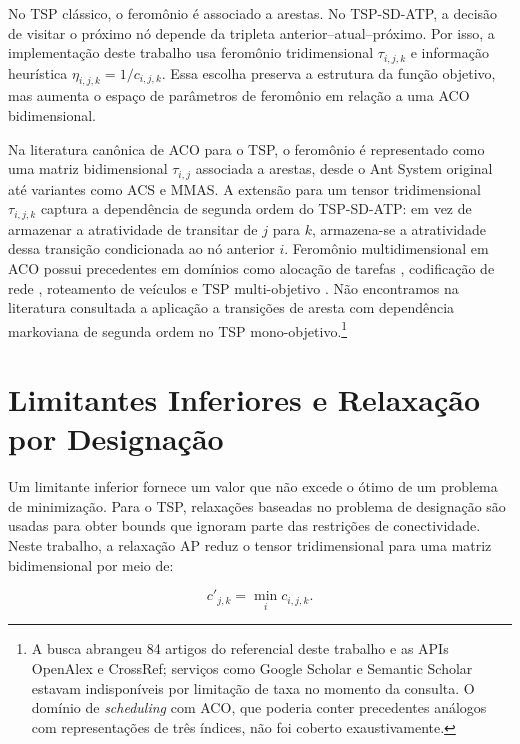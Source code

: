 No \ac{TSP} clássico, o feromônio é associado a arestas. No \ac{TSP-SD-ATP}, a decisão de visitar o próximo nó depende da tripleta anterior--atual--próximo. Por isso, a implementação deste trabalho usa feromônio tridimensional $\tau_{i,j,k}$ e informação heurística $\eta_{i,j,k}=1/c_{i,j,k}$. Essa escolha preserva a estrutura da função objetivo, mas aumenta o espaço de parâmetros de feromônio em relação a uma \ac{ACO} bidimensional.

Na literatura canônica de \ac{ACO} para o \ac{TSP}, o feromônio é representado como uma matriz bidimensional $\tau_{i,j}$ associada a arestas, desde o Ant System original \cite{dorigo1996ant} até variantes como ACS \cite{dorigo1997ant} e MMAS. A extensão para um tensor tridimensional $\tau_{i,j,k}$ captura a dependência de segunda ordem do \ac{TSP-SD-ATP}: em vez de armazenar a atratividade de transitar de $j$ para $k$, armazena-se a atratividade dessa transição condicionada ao nó anterior $i$. Feromônio multidimensional em \ac{ACO} possui precedentes em domínios como alocação de tarefas \cite{wang2013aco}, codificação de rede \cite{wang2015aco}, roteamento de veículos \cite{geng2025mdaco} e \ac{TSP} multi-objetivo \cite{starzec2026motsp}. Não encontramos na literatura consultada a aplicação a transições de aresta com dependência markoviana de segunda ordem no \ac{TSP} mono-objetivo.\footnote{A busca abrangeu 84 artigos do referencial deste trabalho e as APIs OpenAlex e CrossRef; serviços como Google Scholar e Semantic Scholar estavam indisponíveis por limitação de taxa no momento da consulta. O domínio de \textit{scheduling} com \ac{ACO}, que poderia conter precedentes análogos com representações de três índices, não foi coberto exaustivamente.}

\section{Limitantes Inferiores e Relaxação por Designação}
\label{sec:lowerbound}

Um limitante inferior fornece um valor que não excede o ótimo de um problema de minimização. Para o \ac{TSP}, relaxações baseadas no problema de designação são usadas para obter bounds que ignoram parte das restrições de conectividade. Neste trabalho, a relaxação \ac{AP} reduz o tensor tridimensional para uma matriz bidimensional por meio de:

\begin{equation}
c'_{j,k} = \min_i c_{i,j,k}.
\label{eq:reducao-ap}
\end{equation}

